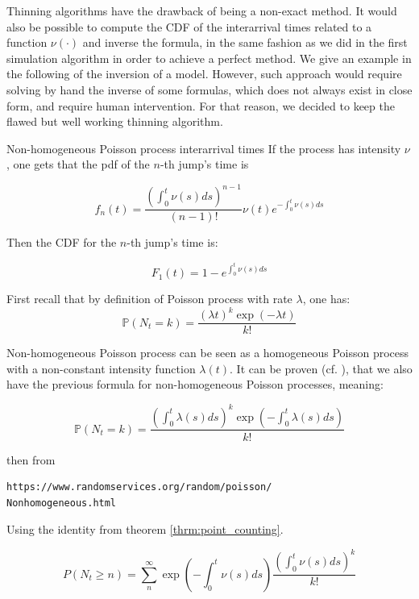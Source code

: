 
\begin{remarque} 
Thinning algorithms have the drawback of being a non-exact method. It would also be possible to compute the CDF of the interarrival times related to a function $\nu( \cdot )$ and inverse the formula, in the same fashion as we did in the first simulation algorithm in order to achieve a perfect method. We give an example in the following of the inversion of a model. However, such approach would require solving by hand the inverse of some formulas, which does not always exist in close form, and require human intervention. For that reason, we decided to keep the flawed but well working thinning algorithm. 
\end{remarque}


\begin{theoreme}{Non-homogeneous Poisson process interarrival times}
If the process has intensity $\nu$, one gets that the pdf of the $n$-th jump's time is 

$$
f_n(t)  = \frac {\left ( \int_0^t \nu(s) ds \right )^{n-1}}{(n-1)!} \nu(t) e^{-  \int_0^t \nu(s) ds }
$$

Then the CDF for the $n$-th jump's time is:

$$
F_1(t) = 1 - e^{  \int_0^t \nu(s) ds } 
$$

\end{theoreme}


\begin{demo}{}{}
First recall that by definition of Poisson process with rate $\lambda$, one has:
$$
\mathbb P(N_t = k) = \frac { (\lambda t)^k \exp(- \lambda t ) }{k !}$$

Non-homogeneous Poisson process can be seen as a homogeneous Poisson process with a non-constant intensity function $\lambda (t)$. It can be proven (cf. \cite{Veraart}), that we also have the previous formula for non-homogeneous Poisson processes, meaning:

$$
\mathbb P(N_t = k) = \frac { \left ( \int_0^t \lambda(s) ds \right )^k \exp \left ( - \int_0^t \lambda(s) ds \right )  }{k !}$$

then from \begin{verbatim}
https://www.randomservices.org/random/poisson/
Nonhomogeneous.html
\end{verbatim}

Using the identity from theorem \ref{thrm:point_counting}.

$$ P( N_t \geq n ) = \sum_n^{\infty} \exp \left ( - \int_0^t \nu(s) ds \right ) \frac{ \left ( \int_0^t \nu(s) ds \right ) ^k }{k !} 
$$
\end{demo}


